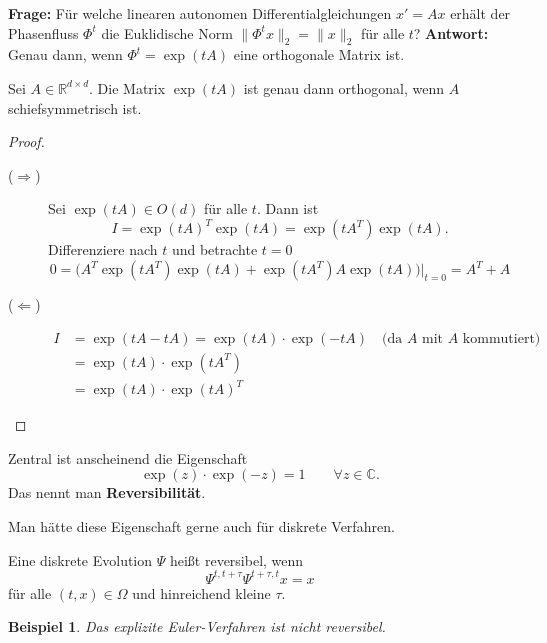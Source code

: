 \documentclass[german]{scrreprt}
\newcommand{\begriff}[1]{\textbf{#1}}
\newcommand{\R}{\mathbb R}
\renewcommand{\C}{\mathbb C}
\newcommand{\norm}[1]{\lVert #1 \rVert}
\theoremstyle{plain}
\theoremstyle{nonumberplain}
\theoremstyle{nonumberplain}
\newtheorem{bsp}{Beispiel}
\theoremstyle{nonumberplain}
\newtheorem{proof}{Beweis}
\begin{document}
\textbf{Frage:} Für welche linearen autonomen Differentialgleichungen $x' = Ax$ erhält der Phasenfluss $\Phi^t$ die Euklidische Norm $\norm{\Phi^t x}_2 = \norm{x}_2$ für alle $t$?
\textbf{Antwort:} Genau dann, wenn $\Phi^t = \exp(tA)$ eine orthogonale Matrix ist.
\begin{satz}
	\label{thm:normerhaltende_fluesse}
	Sei $A\in\R^{d \times d}$. Die Matrix $\exp(tA)$ ist genau dann orthogonal,
	wenn $A$ schiefsymmetrisch ist.
\end{satz}
\begin{proof}
	\begin{description}
		\item[($\boldsymbol{\Rightarrow}$)] Sei $\exp(tA)\in O(d)$ für alle $t$.
		Dann ist
		\begin{equation*}
		I = \exp(tA)^T \exp(tA) = \exp(tA^T) \exp(tA).
		\end{equation*}
		Differenziere nach $t$ und betrachte $t=0$
		\begin{equation*}
		0=\Big(A^T \exp(tA^T) \exp(tA) + \exp(tA^T)A \exp(tA) \Big)\Big|_{t=0} = A^T+A
		\end{equation*}
		\item[($\boldsymbol{\Leftarrow}$)] 
		\begin{align*}
		I
		&= \exp(tA-tA) = \exp(tA)\cdot \exp(-tA)\quad\text{(da $A$ mit $A$ kommutiert)}\\
		&= \exp(tA)\cdot \exp(tA^T) \\
		&= \exp(tA)\cdot \exp(tA)^T	 
		\end{align*}
	\end{description}
\end{proof}

Zentral ist anscheinend die Eigenschaft
\begin{equation*}
\exp(z)\cdot \exp(-z) = 1\qquad \forall z\in\C.
\end{equation*}
Das nennt man \begriff{Reversibilität}.

Man hätte diese Eigenschaft gerne auch für diskrete Verfahren.
\begin{definition}
	Eine diskrete Evolution $\Psi$ heißt reversibel, wenn
	\begin{equation*}
	\Psi^{t,t+\tau}\Psi^{t+\tau,t} x = x
	\end{equation*}
	für alle $(t,x)\in\Omega$ und hinreichend kleine $\tau$.
\end{definition}

\begin{bsp}
	Das explizite Euler-Verfahren ist nicht reversibel.
\end{bsp}
\end{document}
